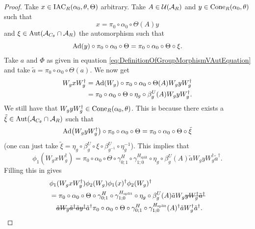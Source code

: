 \documentclass[12pt,a4paper,twoside]{article}
\numberwithin{equation}{section}
\begin{document}
\begin{proof}
	Take $x\in \textrm{IAC}_R(\alpha_0,\theta,\Theta)$ arbitrary. Take $A\in\mathcal U(\mathcal A_R)$ and $y\in\textrm{Cone}_R(\alpha_0,\theta)$ such that
	\begin{equation}
		x=\pi_0\circ\alpha_0\circ\Theta(A)y
	\end{equation}
	and $\xi\in\Aut{\AA_{C_\theta}\cap \AA_R}$ the automorphism such that
	\begin{equation}
		\Ad{y}\circ\pi_0\circ\alpha_0\circ\Theta=\pi_0\circ\alpha_0\circ\Theta\circ\xi.
	\end{equation}
	Take $a$ and $\Phi$ as given in equation \eqref{eq:DefinitionOfGroupMorphismVAutEquation} and take $\tilde{a}=\pi_0\circ\alpha_0\circ\Theta(a)$. We now get
	\begin{align}
		W_g x W_g^\dagger&=\Ad{W_g}\circ\pi_0\circ\alpha_0\circ\Theta(A) W_gyW_g^\dagger\\
		&=\pi_0\circ\alpha_0\circ\Theta\circ\eta_g\circ\beta_g^U(A) W_gyW_g^\dagger.
	\end{align}
	We still have that $W_g yW_g^\dagger\in\textrm{Cone}_R(\alpha_0,\theta)$. This is because there exists a $\tilde{\xi}\in\Aut{\AA_{C_\theta}\cap \AA_R}$ such that
	\begin{equation}
		\Ad{W_gyW_g^\dagger}\circ \pi_0\circ\alpha_0\circ\Theta=\pi_0\circ\alpha_0\circ\Theta\circ\tilde\xi
	\end{equation}
	(one can just take $\tilde\xi=\eta_g\circ\beta_g^U\circ\xi\circ\beta_{g^{-1}}^U\circ\eta_g^{-1}$). This implies that
	\begin{equation}\label{eq:lem:phi1phi2matchingCondition:Proof_W_g_Part}
		\phi_1(W_gxW_g^{\dagger})=\pi_0\circ\alpha_0\circ\Theta\circ\gamma^{H}_{0;1}\circ\gamma^{H_\text{split}}_{1;0}\circ\eta_g\circ\beta_g^U(A)\tilde{a}W_gyW_g^\dagger\tilde{a}^\dagger.
	\end{equation}
	Filling this in gives
	\begin{align}
		&\phi_1(W_gxW_g^\dagger)\phi_2(W_g)\phi_1(x)^\dagger\phi_2(W_g)^\dagger\\
		\label{eq:phi1phi2matchingConditionEquation}
		&=\pi_0\circ\alpha_0\circ\Theta\circ\gamma^{H}_{0;1}\circ\gamma^{H_\text{split}}_{1;0}\circ\eta_g\circ\beta_g^U(A)\tilde{a}W_g\stkout{yW_g^\dagger\tilde{a}^\dagger}\\
		\nonumber
		&\quad\stkout{\tilde{a}W_g\tilde{a}^\dagger\tilde{a}y^\dagger}\tilde{a}^\dagger\pi_0\circ\alpha_0\circ\Theta\circ\gamma^{H}_{0;1}\circ\gamma^{H_\text{split}}_{1;0}(A)^\dagger\tilde{a}W_g^\dagger\tilde{a}^\dagger.
	\end{align}

\end{proof}
\end{document}
